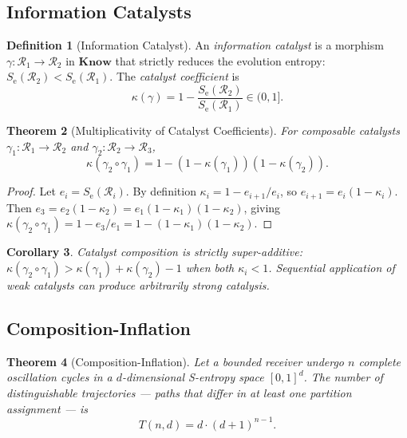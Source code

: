 \documentclass[twocolumn,11pt,a4paper]{article}
\theoremstyle{plain}
\newtheorem{theorem}{Theorem}[section]
\newtheorem{corollary}[theorem]{Corollary}
\theoremstyle{definition}
\newtheorem{definition}[theorem]{Definition}
\theoremstyle{remark}
\newcommand{\Se}{S_{\mathrm{e}}}
\begin{document}
\subsection{Information Catalysts}

\begin{definition}[Information Catalyst]
\label{def:catalyst}
An \emph{information catalyst} is a morphism $\gamma : \mathcal{R}_1 \to \mathcal{R}_2$ in $\mathbf{Know}$ that strictly reduces the evolution entropy: $\Se(\mathcal{R}_2) < \Se(\mathcal{R}_1)$.  The \emph{catalyst coefficient} is
\begin{equation}
  \kappa(\gamma) = 1 - \frac{\Se(\mathcal{R}_2)}{\Se(\mathcal{R}_1)} \in (0,1].
\end{equation}
\end{definition}

\begin{theorem}[Multiplicativity of Catalyst Coefficients]
\label{thm:catalyst_mult}
For composable catalysts $\gamma_1 : \mathcal{R}_1 \to \mathcal{R}_2$ and $\gamma_2 : \mathcal{R}_2 \to \mathcal{R}_3$,
\begin{equation}
  \kappa(\gamma_2 \circ \gamma_1) = 1 - (1-\kappa(\gamma_1))(1-\kappa(\gamma_2)).
  \label{eq:catalyst_mult}
\end{equation}
\end{theorem}

\begin{proof}
Let $e_i = \Se(\mathcal{R}_i)$.  By definition $\kappa_i = 1 - e_{i+1}/e_i$, so $e_{i+1} = e_i(1-\kappa_i)$.  Then
$e_3 = e_2(1-\kappa_2) = e_1(1-\kappa_1)(1-\kappa_2)$, giving
$\kappa(\gamma_2\circ\gamma_1) = 1 - e_3/e_1 = 1-(1-\kappa_1)(1-\kappa_2)$.
\end{proof}

\begin{corollary}
Catalyst composition is strictly super-additive: $\kappa(\gamma_2\circ\gamma_1) > \kappa(\gamma_1) + \kappa(\gamma_2) - 1$ when both $\kappa_i < 1$.  Sequential application of weak catalysts can produce arbitrarily strong catalysis.
\end{corollary}

\subsection{Composition-Inflation}

\begin{theorem}[Composition-Inflation]
\label{thm:inflation}
Let a bounded receiver undergo $n$ complete oscillation cycles in a $d$-dimensional S-entropy space $[0,1]^d$.  The number of \emph{distinguishable trajectories} — paths that differ in at least one partition assignment — is
\begin{equation}
  T(n,d) = d\cdot(d+1)^{n-1}.
  \label{eq:inflation}
\end{equation}
\end{theorem}
\end{document}
